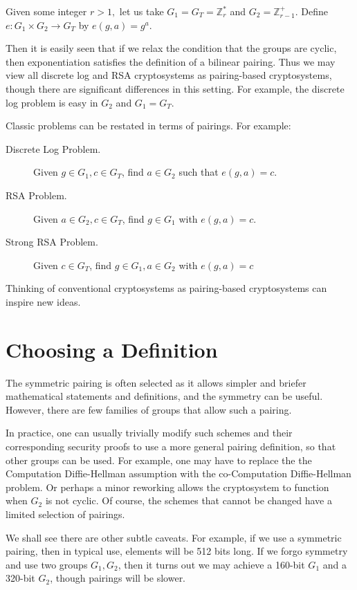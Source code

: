 Given some integer $r > 1,$
let us take $G_1 = G_T = \mathbb{Z}_r^*$ and $G_2 = \mathbb{Z}_{r-1}^+$.
Define $e:G_1\times G_2 \rightarrow G_T$ by $e(g, a)= g^a$.

Then it is easily seen that if we relax the condition that the groups
are cyclic, then exponentiation satisfies the definition of a bilinear pairing.
Thus we may view all discrete log and RSA cryptosystems
as pairing-based cryptosystems, though there are significant differences
in this setting. For example, the discrete log problem is easy
in $G_2$ and $G_1 = G_T$.

Classic problems can be restated in terms of
pairings. For example:

\begin{description}
\item[Discrete Log Problem.]
Given $g \in G_1, c \in G_T$, find $a \in G_2$ such that $e(g,a) = c$.
\item[RSA Problem.]
Given $a \in G_2, c \in G_T$, find $g \in G_1$ with
$e(g,a) = c$.
\item[Strong RSA Problem.]
Given $c \in G_T$, find $g \in G_1, a\in G_2$ with
$e(g,a) = c$
\end{description}

Thinking of conventional cryptosystems as pairing-based cryptosystems
can inspire new ideas.

\section{Choosing a Definition}

The symmetric pairing is often selected
as it allows simpler and briefer mathematical statements and definitions,
and the symmetry can be useful.
However, there are few families of groups that allow such a pairing.

In practice, one can usually trivially modify such
schemes and their corresponding
security proofs to use a more general pairing definition,
so that other groups can be used. For example, one may have to replace the
the Computation Diffie-Hellman assumption with
the co-Computation Diffie-Hellman problem. Or perhaps
a minor reworking allows the cryptosystem to function when $G_2$
is not cyclic.
Of course, the schemes that cannot be changed have a limited selection
of pairings.

We shall see there are other subtle caveats.
For example, if we use a symmetric pairing, then in typical use,
elements will be 512 bits long.
If we forgo symmetry and use two groups $G_1, G_2$,
then it turns out we may achieve a 160-bit $G_1$ and a 320-bit $G_2$,
though pairings will be slower.

